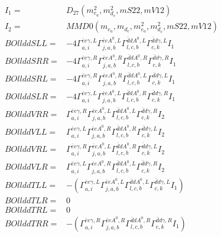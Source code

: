 \documentclass[A4,landscape]{article}
\begin{document}
\begin{align} 
I_1 = & D_{27}(m^2_{e_{{a}}}, m^2_{d_{{c}}}, mS22, mV12) \\ 
I_2 = & MMD0(m_{e_{{a}}}, m_{d_{{c}}}, m^2_{e_{{a}}}, m^2_{d_{{c}}}, mS22, mV12) \\ 
  BOllddSLL= & -4  \Gamma^{\bar{e}e \gamma ,L}_{a, i} \Gamma^{\bar{e}e A^0 ,L}_{j, a, b} \Gamma^{\bar{d}d A^0 ,L}_{l, c, b} \Gamma^{\bar{d}d \gamma ,L}_{c, k} I_1 \\ 
  BOllddSRR= & -4  \Gamma^{\bar{e}e \gamma ,R}_{a, i} \Gamma^{\bar{e}e A^0 ,R}_{j, a, b} \Gamma^{\bar{d}d A^0 ,R}_{l, c, b} \Gamma^{\bar{d}d \gamma ,R}_{c, k} I_1 \\ 
  BOllddSRL= & -4  \Gamma^{\bar{e}e \gamma ,R}_{a, i} \Gamma^{\bar{e}e A^0 ,R}_{j, a, b} \Gamma^{\bar{d}d A^0 ,L}_{l, c, b} \Gamma^{\bar{d}d \gamma ,L}_{c, k} I_1 \\ 
  BOllddSLR= & -4  \Gamma^{\bar{e}e \gamma ,L}_{a, i} \Gamma^{\bar{e}e A^0 ,L}_{j, a, b} \Gamma^{\bar{d}d A^0 ,R}_{l, c, b} \Gamma^{\bar{d}d \gamma ,R}_{c, k} I_1 \\ 
  BOllddVRR= &  \Gamma^{\bar{e}e \gamma ,R}_{a, i} \Gamma^{\bar{e}e A^0 ,L}_{j, a, b} \Gamma^{\bar{d}d A^0 ,L}_{l, c, b} \Gamma^{\bar{d}d \gamma ,R}_{c, k} I_2 \\ 
  BOllddVLL= &  \Gamma^{\bar{e}e \gamma ,L}_{a, i} \Gamma^{\bar{e}e A^0 ,R}_{j, a, b} \Gamma^{\bar{d}d A^0 ,R}_{l, c, b} \Gamma^{\bar{d}d \gamma ,L}_{c, k} I_2 \\ 
  BOllddVRL= &  \Gamma^{\bar{e}e \gamma ,R}_{a, i} \Gamma^{\bar{e}e A^0 ,L}_{j, a, b} \Gamma^{\bar{d}d A^0 ,R}_{l, c, b} \Gamma^{\bar{d}d \gamma ,L}_{c, k} I_2 \\ 
  BOllddVLR= &  \Gamma^{\bar{e}e \gamma ,L}_{a, i} \Gamma^{\bar{e}e A^0 ,R}_{j, a, b} \Gamma^{\bar{d}d A^0 ,L}_{l, c, b} \Gamma^{\bar{d}d \gamma ,R}_{c, k} I_2 \\ 
  BOllddTLL= & -( \Gamma^{\bar{e}e \gamma ,L}_{a, i} \Gamma^{\bar{e}e A^0 ,L}_{j, a, b} \Gamma^{\bar{d}d A^0 ,L}_{l, c, b} \Gamma^{\bar{d}d \gamma ,L}_{c, k} I_1) \\ 
  BOllddTLR= & 0 \\ 
  BOllddTRL= & 0 \\ 
  BOllddTRR= & -( \Gamma^{\bar{e}e \gamma ,R}_{a, i} \Gamma^{\bar{e}e A^0 ,R}_{j, a, b} \Gamma^{\bar{d}d A^0 ,R}_{l, c, b} \Gamma^{\bar{d}d \gamma ,R}_{c, k} I_1) \\ 
\end{align} 
\end{document}

